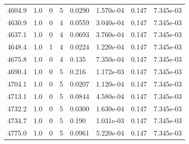 \documentclass[preview]{standalone}
\begin{document}
{{{{{{{{{{\begin{tabular}{L{1.2cm}C{1.2cm} C{0.3cm}C{0.5cm} C{1.4cm}C{1.4cm} C{1.4cm}C{1.4cm}}
  4604.9  &   1.0  & 0     &  5 &  0.0290  & 1.570e-04  & 0.147 &  7.345e-03   \\ 
  4630.9  &   1.0  & 0     &  4 &  0.0559  & 3.040e-04  & 0.147 &  7.345e-03   \\ 
  4637.1  &   1.0  & 0     &  4 &  0.0693  & 3.760e-04  & 0.147 &  7.345e-03   \\ 
  4648.4  &   1.0  & 1     &  4 &  0.0224  & 1.220e-04  & 0.147 &  7.345e-03   \\ 
  4675.8  &   1.0  & 0     &  4 &  0.135  & 7.350e-04  & 0.147 &  7.345e-03   \\ 
  4690.4  &   1.0  & 0     &  5 &  0.216  & 1.172e-03  & 0.147 &  7.345e-03   \\ 
  4704.1  &   1.0  & 0     &  5 &  0.0207  & 1.120e-04  & 0.147 &  7.345e-03   \\ 
  4713.1  &   1.0  & 0     &  5 &  0.0844  & 4.580e-04  & 0.147 &  7.345e-03   \\ 
  4732.2  &   1.0  & 0     &  5 &  0.0300  & 1.630e-04  & 0.147 &  7.345e-03   \\ 
  4734.7  &   1.0  & 0     &  5 &  0.190  & 1.031e-03  & 0.147 &  7.345e-03   \\ 
  4775.0  &   1.0  & 0     &  5 &  0.0961  & 5.220e-04  & 0.147 &  7.345e-03   \\ 
\hline 
\end{tabular} 

}}}}}}}}}}
\end{document}
